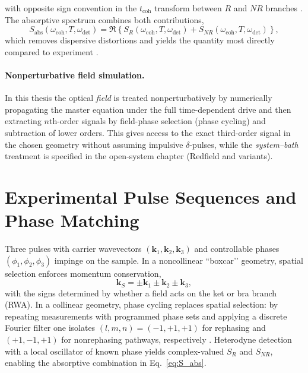 with opposite sign convention in the $t_{\mathrm{coh}}$ transform between $R$ and $NR$ branches \cite{cho2009twodimensionalopticalspectroscopy}. The absorptive spectrum combines both contributions,
\begin{equation}
    S_{\mathrm{abs}}(\omega_{\mathrm{coh}},T,\omega_{\mathrm{det}})=
    \Re\!\left\{S_R(\omega_{\mathrm{coh}},T,\omega_{\mathrm{det}})+S_{NR}(\omega_{\mathrm{coh}},T,\omega_{\mathrm{det}})\right\},
    \label{copy:eq:S_abs}
\end{equation}
which removes dispersive distortions and yields the quantity most directly compared to experiment \cite{jonas2003twodimensionalelectronicspectroscopy}.

\paragraph{Nonperturbative field simulation.}
In this thesis the optical \emph{field} is treated nonperturbatively by numerically propagating the master equation under the full time-dependent drive and then extracting $n$th-order signals by field-phase selection (phase cycling) and subtraction of lower orders. This gives access to the exact third-order signal in the chosen geometry without assuming impulsive $\delta$-pulses, while the \emph{system--bath} treatment is specified in the open-system chapter (Redfield and variants).

\section{Experimental Pulse Sequences and Phase Matching}
\label{copy:sec:phase_matching}
\noindent
Three pulses with carrier wavevectors $(\boldsymbol{k}_1,\boldsymbol{k}_2,\boldsymbol{k}_3)$ and controllable phases $(\phi_1,\phi_2,\phi_3)$ impinge on the sample. In a noncollinear ``boxcar’’ geometry, spatial selection enforces momentum conservation,
\begin{equation}
    \boldsymbol{k}_S=\pm \boldsymbol{k}_1 \pm \boldsymbol{k}_2 \pm \boldsymbol{k}_3,
    \label{copy:eq:PM_general}
\end{equation}
with the signs determined by whether a field acts on the ket or bra branch (RWA). In a collinear geometry, phase cycling replaces spatial selection: by repeating measurements with programmed phase sets and applying a discrete Fourier filter one isolates $(l,m,n)=(-1,+1,+1)$ for rephasing and $(+1,-1,+1)$ for nonrephasing pathways, respectively \cite{hamm2005principlesnonlinearoptical, cho2009twodimensionalopticalspectroscopy}. Heterodyne detection with a local oscillator of known phase yields complex-valued $S_R$ and $S_{NR}$, enabling the absorptive combination in Eq.~\eqref{eq:S_abs}.

